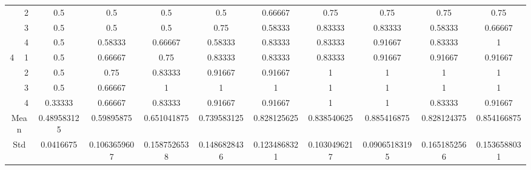 \documentclass[draft,dvipsnames]{drexel-thesis}
\begin{document}
\begin{thesis}
\begin{table}[!t]
{\begin{tabular}{|c|c|c|c|c|c|c|c|c|c|c|}
                      & 2                   & 0.5         & 0.5          & 0.5          & 0.5          & 0.66667      & 0.75         & 0.75          & 0.75         & 0.75         \\ \cline{2-11}
                      & 3                   & 0.5         & 0.5          & 0.5          & 0.75         & 0.58333      & 0.83333      & 0.83333       & 0.58333      & 0.66667      \\ \cline{2-11}
                      & 4                   & 0.5         & 0.58333      & 0.66667      & 0.58333      & 0.83333      & 0.83333      & 0.91667       & 0.83333      & 1            \\ \hline
\multirow{4}{*}{4}    & 1                   & 0.5         & 0.66667      & 0.75         & 0.83333      & 0.83333      & 0.83333      & 0.91667       & 0.91667      & 0.91667      \\ \cline{2-11}
                      & 2                   & 0.5         & 0.75         & 0.83333      & 0.91667      & 0.91667      & 1            & 1             & 1            & 1            \\ \cline{2-11}
                      & 3                   & 0.5         & 0.66667      & 1            & 1            & 1            & 1            & 1             & 1            & 1            \\ \cline{2-11}
                      & 4                   & 0.33333     & 0.66667      & 0.83333      & 0.91667      & 0.91667      & 1            & 1             & 0.83333      & 0.91667      \\ \hline
\multicolumn{2}{|c|}{Mean}                  & 0.489583125 & 0.59895875   & 0.651041875  & 0.739583125  & 0.828125625  & 0.838540625  & 0.885416875   & 0.828124375  & 0.854166875  \\ \hline
\multicolumn{2}{|c|}{Std}                   & 0.0416675   & 0.1063659607 & 0.1587526538 & 0.1486828436 & 0.1234868321 & 0.1030496217 & 0.09065183195 & 0.1651852566 & 0.1536588031 \\ \hline
\end{tabular}}
\end{table}


\end{thesis}
\end{document}
